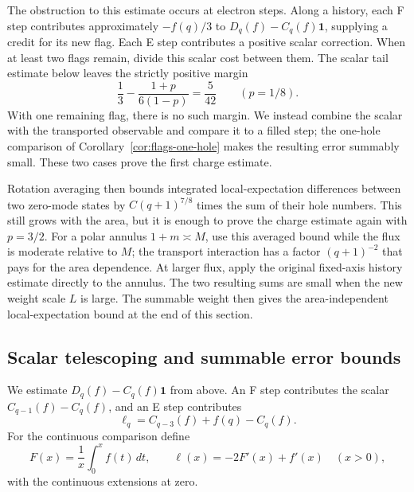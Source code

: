 The obstruction to this estimate occurs at electron steps.  Along a
history, each F step contributes approximately $-f(q)/3$ to
$D_q(f)-C_q(f)\mathbf1$, supplying a credit for its new flag.  Each E
step contributes a positive scalar correction.  When at least two
flags remain, divide this scalar cost between them.  The scalar tail
estimate below leaves the strictly positive margin
\[
 \frac13-\frac{1+p}{6(1-p)}=\frac5{42}\qquad(p=1/8).
\]
With one remaining flag, there is no such margin.  We instead combine
the scalar with the transported observable and compare it to a filled
step; the one-hole comparison of Corollary~\ref{cor:flags-one-hole}
makes the resulting error summably small.  These two cases prove the
first charge estimate.

Rotation averaging then bounds integrated local-expectation differences
between two zero-mode states by $C(q+1)^{7/8}$ times the sum of their
hole numbers.  This still grows with the
area, but it is enough to prove the charge estimate again with $p=3/2$.
For a polar annulus $1+m\asymp M$, use this averaged bound while the
flux is moderate relative to $M$; the transport interaction has a
factor $(q+1)^{-2}$ that pays for the area dependence.  At larger
flux, apply the original fixed-axis history estimate directly to the
annulus.  The two resulting sums are small when the new weight scale
$L$ is large.  The summable weight then gives the area-independent
local-expectation bound at the end of this section.

\subsection{Scalar telescoping and summable error bounds}

We estimate $D_q(f)-C_q(f)\mathbf1$ from above.  An F step contributes
the scalar $C_{q-1}(f)-C_q(f)$, and an E step contributes
\begin{equation}\label{eq:charge-electron-scalar}
 \ell_q=C_{q-3}(f)+f(q)-C_q(f).
\end{equation}
For the continuous comparison define
\begin{equation}\label{eq:charge-continuous-scalar}
 F(x)=\frac1x\int_0^x f(t)\,dt,\qquad
 \ell(x)=-2F'(x)+f'(x)\quad(x>0),
\end{equation}
with the continuous extensions at zero.

